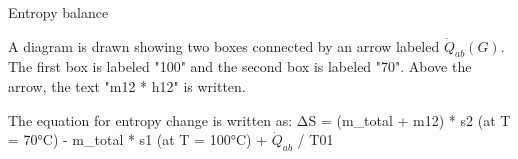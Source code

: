 Entropy balance  

A diagram is drawn showing two boxes connected by an arrow labeled \( \dot{Q}_{ab}(G) \). The first box is labeled "100" and the second box is labeled "70". Above the arrow, the text "m12 * h12" is written.  

The equation for entropy change is written as:  
ΔS = (m_total + m12) * s2 (at T = 70°C) - m_total * s1 (at T = 100°C) + \( \dot{Q}_{ab} \) / T01